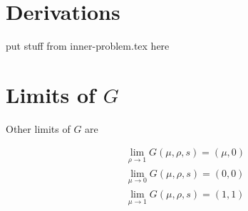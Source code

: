 \documentclass[../../main.tex]{subfiles}
\begin{document}
\section{Derivations}\label{appendix:derivations}

{\red put stuff from inner-problem.tex here}

\section[Limits of Shift]{Limits of $G$}

Other limits of $G$ are

\begin{equation}
    \begin{split}
        \lim_{\rho \rightarrow 1} G(\mu, \rho, s) = (\mu, 0) \\
        \lim_{\mu \rightarrow 0} G(\mu, \rho, s) = (0, 0) \\
        \lim_{\mu \rightarrow 1} G(\mu, \rho, s) = (1, 1)
    \end{split}
\end{equation}
\end{document}
